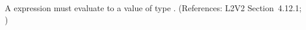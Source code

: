 A \Constraint {} expression must evaluate to a value of type
.  (References: L2V2 Section~4.12.1; )
